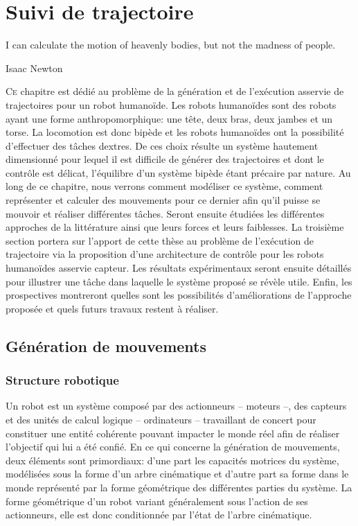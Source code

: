 \chapter{Suivi de trajectoire}
\label{chap:suivi}


\epigraph{\foreignlanguage{USenglish}{I can calculate the motion of
    heavenly bodies, but not the madness of people.}}{Isaac Newton}
\clearpage

\lettrine[lines=2, lraise=0.1, nindent=0em, slope=-.5em]%
{C}{e} chapitre est dédié au problème de la génération et de
l'exécution asservie de trajectoires pour un robot humanoïde. Les
robots humanoïdes sont des robots ayant une forme anthropomorphique:
une tête, deux bras, deux jambes et un torse. La locomotion est donc
bipède et les robots humanoïdes ont la possibilité d'effectuer des
tâches dextres. De ces choix résulte un système hautement dimensionné
pour lequel il est difficile de générer des trajectoires et dont le
contrôle est délicat, l'équilibre d'un système bipède étant précaire
par nature. Au long de ce chapitre, nous verrons comment modéliser ce
système, comment représenter et calculer des mouvements pour ce
dernier afin qu'il puisse se mouvoir et réaliser différentes
tâches. Seront ensuite étudiées les différentes approches de la
littérature ainsi que leurs forces et leurs faiblesses. La troisième
section portera sur l'apport de cette thèse au problème de l'exécution
de trajectoire via la proposition d'une architecture de contrôle pour
les robots humanoïdes asservie capteur. Les résultats expérimentaux
seront ensuite détaillés pour illustrer une tâche dans laquelle le
système proposé se révèle utile. Enfin, les prospectives montreront
quelles sont les possibilités d'améliorations de l'approche proposée
et quels futurs travaux restent à réaliser.

\section{Génération de mouvements}
\subsection{Structure robotique}

Un robot est un système composé par des actionneurs -- moteurs --, des
capteurs et des unités de calcul logique -- ordinateurs -- travaillant
de concert pour constituer une entité cohérente pouvant impacter le
monde réel afin de réaliser l'objectif qui lui a été confié. En ce qui
concerne la génération de mouvements, deux éléments sont primordiaux:
d'une part les capacités motrices du système, modélisées sous la forme
d'un arbre cinématique et d'autre part sa forme dans le monde
représenté par la forme géométrique des différentes parties du
système. La forme géométrique d'un robot variant généralement sous
l'action de ses actionneurs, elle est donc conditionnée par l'état de
l'arbre cinématique.

